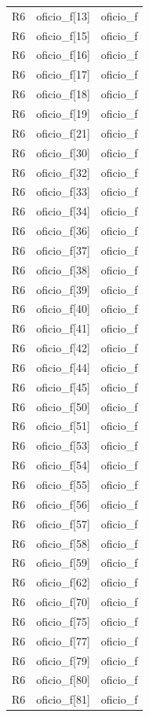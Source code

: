 \begin{longtable}{lll}
R6 & oficio\_f[13] & oficio\_f \\
R6 & oficio\_f[15] & oficio\_f \\
R6 & oficio\_f[16] & oficio\_f \\
R6 & oficio\_f[17] & oficio\_f \\
R6 & oficio\_f[18] & oficio\_f \\
R6 & oficio\_f[19] & oficio\_f \\
R6 & oficio\_f[21] & oficio\_f \\
R6 & oficio\_f[30] & oficio\_f \\
R6 & oficio\_f[32] & oficio\_f \\
R6 & oficio\_f[33] & oficio\_f \\
R6 & oficio\_f[34] & oficio\_f \\
R6 & oficio\_f[36] & oficio\_f \\
R6 & oficio\_f[37] & oficio\_f \\
R6 & oficio\_f[38] & oficio\_f \\
R6 & oficio\_f[39] & oficio\_f \\
R6 & oficio\_f[40] & oficio\_f \\
R6 & oficio\_f[41] & oficio\_f \\
R6 & oficio\_f[42] & oficio\_f \\
R6 & oficio\_f[44] & oficio\_f \\
R6 & oficio\_f[45] & oficio\_f \\
R6 & oficio\_f[50] & oficio\_f \\
R6 & oficio\_f[51] & oficio\_f \\
R6 & oficio\_f[53] & oficio\_f \\
R6 & oficio\_f[54] & oficio\_f \\
R6 & oficio\_f[55] & oficio\_f \\
R6 & oficio\_f[56] & oficio\_f \\
R6 & oficio\_f[57] & oficio\_f \\
R6 & oficio\_f[58] & oficio\_f \\
R6 & oficio\_f[59] & oficio\_f \\
R6 & oficio\_f[62] & oficio\_f \\
R6 & oficio\_f[70] & oficio\_f \\
R6 & oficio\_f[75] & oficio\_f \\
R6 & oficio\_f[77] & oficio\_f \\
R6 & oficio\_f[79] & oficio\_f \\
R6 & oficio\_f[80] & oficio\_f \\
R6 & oficio\_f[81] & oficio\_f \\

\end{longtable}
